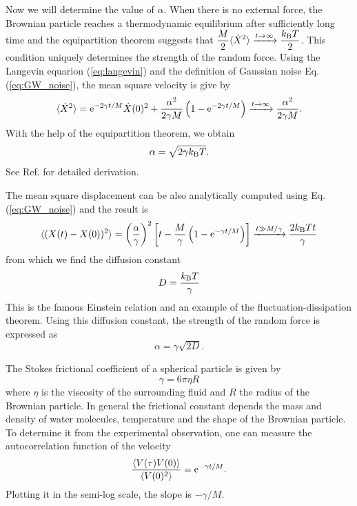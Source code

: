 Now we will determine the value of $\alpha$.
When there is no external force, the Brownian particle reaches a thermodynamic equilibrium after sufficiently long time and the equipartition theorem\cite{equipartition} suggests that  $\displaystyle\frac{M}{2}\langle \dot{X}^2 \rangle \xrightarrow{t \rightarrow \infty} \displaystyle\frac{k_\text{B} T}{2}$.  This condition uniquely determines the strength of the random force.
Using the Langevin equarion (\ref{eq:langevin}) and the definition of Gaussian noise  Eq. (\ref{eq:GW_noise}),  the mean square velocity is give by
\begin{equation}
\langle \dot{X}^2 \rangle = \text{e}^{-2 \gamma t/M} \dot{X}(0)^2 + \frac{\alpha^2}{2\gamma M} \left ( 1- \text{e}^{-2\gamma t/M} \right )
\xrightarrow{t \rightarrow \infty} \frac{\alpha^2}{2\gamma M}.
\end{equation}
With the help of the equipartition theorem, we obtain
\begin{equation}
\alpha = \sqrt{2 \gamma k_\text{B} T}.
\end{equation}
See Ref. \cite{langevin_eq_zwanzig} for detailed derivation.

The mean square displacement can be also  analytically computed using Eq. (\ref{eq:GW_noise})
and the result is
\begin{equation}\label{eq:msd_full}
\langle (X(t)-X(0))^2 \rangle = \left( \frac{\alpha}{\gamma}\right)^2 \left [ t - \frac{M}{\gamma} \left (1- \text{e}^{-\gamma t/M} \right ) \right ]
\xrightarrow{t \gg M/\gamma} \frac{2k_\text{B} T t}{\gamma}
\end{equation}
from which we find the diffusion constant
\begin{equation}
D = \frac{k_\text{B} T}{\gamma}
\end{equation}
This is the famous Einstein relation and an example of the fluctuation-dissipation theorem.\cite{fd_theorem}  Using this diffusion constant, the strength of the random force is expressed as
\begin{equation}
\alpha = \gamma \sqrt{2D}.
\end{equation}

The Stokes frictional coefficient of a spherical particle is given by
\begin{equation}
\gamma = 6 \pi \eta R
\end{equation}
where $\eta$ is the viscosity of the surrounding fluid and $R$ the radius of the Brownian particle.  In general 
the frictional constant depends the mass and density of water molecules, temperature and the shape of the Brownian particle.  To determine it from the experimental observation, one can measure the autocorrelation function of the velocity\cite{langevin_eq_zwanzig}
\begin{equation}\label{eq:autocorr_v}
\frac{\langle V(\tau)V(0) \rangle}{\langle V(0)^2 \rangle} = \text{e}^{-\gamma t/M} .
\end{equation}
Plotting it in the semi-log scale, the slope is $-\gamma/M$.

